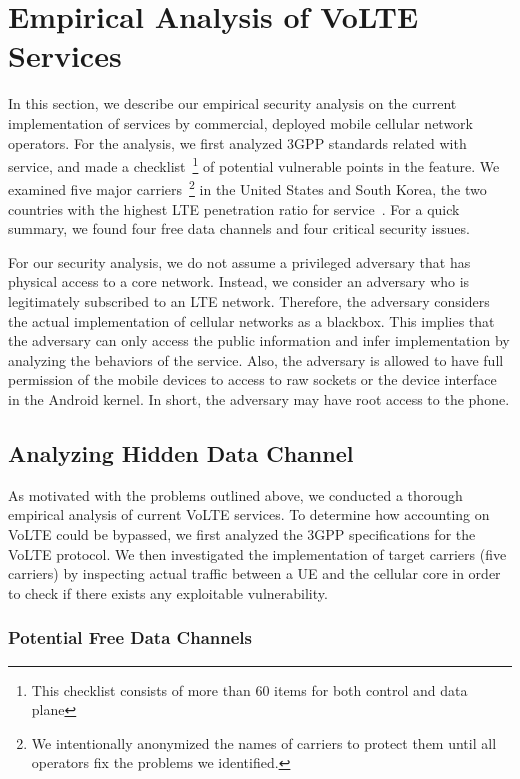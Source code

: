 \chapter{Empirical Analysis of VoLTE Services}
\label{sec:anal}
In this section, we describe our empirical security analysis
on the current implementation of \vt services by commercial,
deployed mobile cellular network operators.
%
For the analysis, we first analyzed 3GPP standards related with \vt service,
and made a checklist~\footnote{This checklist consists of more than 60 items for
both control and data plane} of potential vulnerable points in the \vt feature.
%
We examined five major carriers~\footnote{We intentionally anonymized the names
of carriers to protect them until all operators fix the problems we identified.}
in the United States and South Korea, the two countries with the highest LTE
penetration ratio for \vt service~\cite{idate2014in}.  For a quick summary, we
found four free data channels and four critical security issues.

For our security analysis, we do not assume a privileged adversary that has physical access to a core network. Instead, we consider an
adversary who is legitimately subscribed to an LTE network. Therefore,
the adversary considers the actual implementation of cellular networks
as a blackbox.  This implies that the adversary can only access the
public information and infer implementation by analyzing the behaviors
of the \vt service.
Also, the adversary is allowed to have full permission of the mobile
devices to access to raw sockets or the device interface in the
Android kernel. In short, the adversary may have root access to the phone.


\section{Analyzing Hidden Data Channel}
\label{sec:anal_data}
As motivated with the problems outlined above, we conducted a thorough empirical
analysis of current VoLTE services. To determine how accounting on VoLTE could
be bypassed, we first analyzed the 3GPP specifications for the VoLTE protocol.
We then investigated the implementation of target carriers (five carriers) by
inspecting actual traffic between a UE and the cellular core in order to check
if there exists any exploitable vulnerability.


\subsection{Potential Free Data Channels}
\label{sec:potential-free-data}

